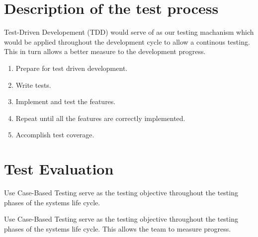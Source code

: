 \documentclass[a4paper,12pt]{article}
\begin{document}
	\section{Description of the test process}
	Test-Driven Developement (TDD) would serve of as our testing machanism which would be applied throughout the development cycle to allow a continous testing. This in turn allows a better measure to the development progress.
	\begin{enumerate}
		\item Prepare for test driven development.
		\item Write tests.
		\item Implement and test the features.
		\item Repeat until all the features are correctly implemented.
		\item Accomplish test coverage. 
	\end{enumerate}
	\section{Test Evaluation}
	Use Case-Based Testing serve as the testing objective throughout the testing phases of the systems life cycle.
	
	Use Case-Based Testing  serve as the testing objective throughout the testing phases of the systems life cycle. This allows the team to measure progress.
\end{document}
